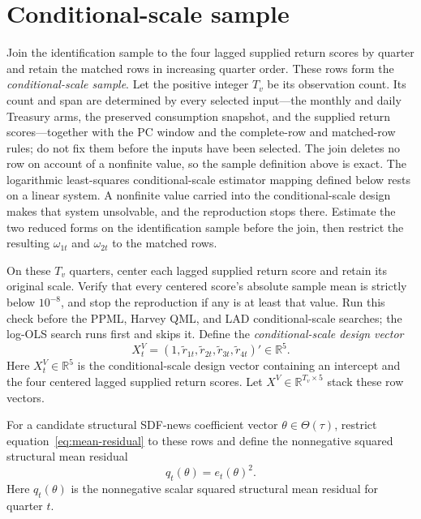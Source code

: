 \documentclass[11pt]{article}
\begin{document}
\section{Conditional-scale sample}
\label{sec:logvar-scale}

Join the identification sample to the four lagged supplied return scores by quarter and retain the
matched rows in increasing quarter order. These rows form the \emph{conditional-scale sample}. Let the positive integer \(T_v\) be its
observation count. Its count and span are determined by every selected input---the monthly and daily
Treasury arms, the preserved consumption snapshot, and the supplied return scores---together with
the PC window and the complete-row and matched-row rules; do not fix them before the inputs
have been selected.
The join deletes no row on account of a nonfinite value, so the sample definition above is exact. The
logarithmic least-squares conditional-scale estimator mapping defined below rests on a linear
system. A nonfinite value
carried into the conditional-scale design makes that system unsolvable, and the reproduction stops
there. Estimate the two reduced forms on the identification
sample before the join, then restrict the
resulting \(\omega_{1t}\) and \(\omega_{2t}\) to the matched rows.

On these \(T_v\) quarters,
center each lagged supplied return score and retain its original scale. Verify that every centered score's absolute sample mean is strictly below \(10^{-8}\), and stop the
reproduction if any is at least that value. Run this check before the PPML, Harvey QML, and LAD
conditional-scale searches; the log-OLS search runs first and skips it. Define
the \emph{conditional-scale design vector}
\begin{equation*}
 X_t^V=(1,\widetilde r_{1t},\widetilde r_{2t},\widetilde r_{3t},
          \widetilde r_{4t})'\in\mathbb R^5.
\end{equation*}
Here \(X_t^V\in\mathbb R^5\) is the conditional-scale design vector containing an intercept and the
four centered lagged supplied return scores. Let \(X^V\in\mathbb R^{T_v\times5}\) stack these row vectors.

For a candidate structural SDF-news coefficient vector \(\theta\in\Theta(\tau)\), restrict
equation~\eqref{eq:mean-residual} to these rows and define the nonnegative squared structural mean residual
\begin{equation*}
 q_t(\theta)=e_t(\theta)^2.
\end{equation*}
Here \(q_t(\theta)\) is the nonnegative scalar squared structural mean residual for quarter \(t\).
\end{document}
